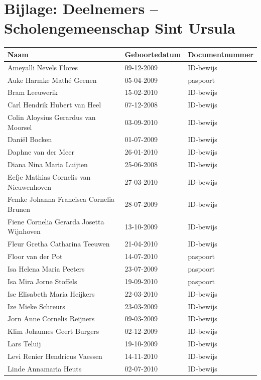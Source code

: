 \documentclass[11pt,a4paper]{letter}
\begin{document}
\section*{Bijlage: Deelnemers – Scholengemeenschap Sint Ursula}
\begin{tabular}{|l|l|l|}
\hline
\textbf{Naam} & \textbf{Geboortedatum} & \textbf{Documentnummer} \\ \hline
Ameyalli Nevels Flores & 09-12-2009 & ID-bewijs \\ \hline
Auke Harmke Mathé Geenen & 05-04-2009 & paspoort \\ \hline
Bram Leeuwerik & 15-02-2010 & ID-bewijs \\ \hline
Carl Hendrik Hubert van Heel & 07-12-2008 & ID-bewijs \\ \hline
Colin Aloysius Gerardus van Moorsel & 03-09-2010 & ID-bewijs \\ \hline
Daniël Bocken & 01-07-2009 & ID-bewijs \\ \hline
Daphne van der Meer & 26-01-2010 & ID-bewijs \\ \hline
Diana Nina Maria Luijten & 25-06-2008 & ID-bewijs \\ \hline
Eefje Mathias Cornelis van Nieuwenhoven & 27-03-2010 & ID-bewijs \\ \hline
Femke Johanna Francisca Cornelia Brunen & 28-07-2009 & ID-bewijs \\ \hline
Fiene Cornelia Gerarda Josetta Wijnhoven & 13-10-2009 & ID-bewijs \\ \hline
Fleur Gretha Catharina Teeuwen & 21-04-2010 & ID-bewijs \\ \hline
Floor van der Pot & 14-07-2010 & paspoort \\ \hline
Isa Helena Maria Peeters & 23-07-2009 & paspoort \\ \hline
Isa Mira Jorne Stoffels & 19-09-2010 & paspoort \\ \hline
Ise Elisabeth Maria Heijkers & 22-03-2010 & ID-bewijs \\ \hline
Ize Mieke Schreurs & 23-03-2009 & ID-bewijs \\ \hline
Jorn Anne Cornelis Reijners & 09-03-2009 & ID-bewijs \\ \hline
Klim Johannes Geert Burgers & 02-12-2009 & ID-bewijs \\ \hline
Lars Teluij & 19-10-2009 & ID-bewijs \\ \hline
Levi Renier Hendricus Vaessen & 14-11-2010 & ID-bewijs \\ \hline
Linde Annamaria Heuts & 02-07-2010 & ID-bewijs \\ \hline

\end{tabular}
\end{document}
